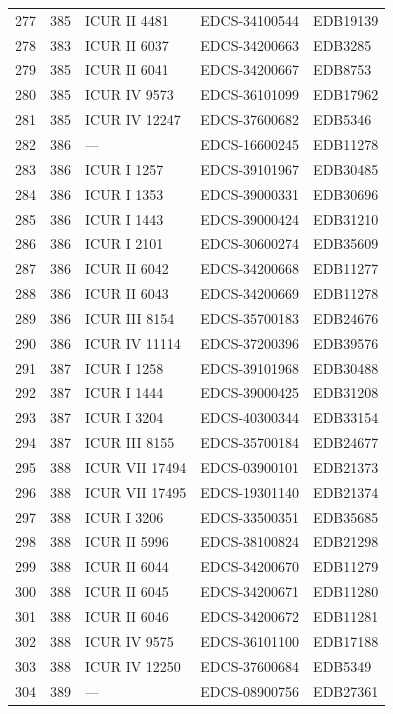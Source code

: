 \begin{longtable}{@{}r r l l l@{}}
277 & 385 & ICUR II 4481 & EDCS-34100544 & EDB19139 \\
278 & 383 & ICUR II 6037 & EDCS-34200663 & EDB3285 \\
279 & 385 & ICUR II 6041 & EDCS-34200667 & EDB8753 \\
280 & 385 & ICUR IV 9573 & EDCS-36101099 & EDB17962 \\
281 & 385 & ICUR IV 12247 & EDCS-37600682 & EDB5346 \\
282 & 386 & — & EDCS-16600245 & EDB11278 \\
283 & 386 & ICUR I 1257 & EDCS-39101967 & EDB30485 \\
284 & 386 & ICUR I 1353 & EDCS-39000331 & EDB30696 \\
285 & 386 & ICUR I 1443 & EDCS-39000424 & EDB31210 \\
286 & 386 & ICUR I 2101 & EDCS-30600274 & EDB35609 \\
287 & 386 & ICUR II 6042 & EDCS-34200668 & EDB11277 \\
288 & 386 & ICUR II 6043 & EDCS-34200669 & EDB11278 \\
289 & 386 & ICUR III 8154 & EDCS-35700183 & EDB24676 \\
290 & 386 & ICUR IV 11114 & EDCS-37200396 & EDB39576 \\
291 & 387 & ICUR I 1258 & EDCS-39101968 & EDB30488 \\
292 & 387 & ICUR I 1444 & EDCS-39000425 & EDB31208 \\
293 & 387 & ICUR I 3204 & EDCS-40300344 & EDB33154 \\
294 & 387 & ICUR III 8155 & EDCS-35700184 & EDB24677 \\
295 & 388 & ICUR VII 17494 & EDCS-03900101 & EDB21373 \\
296 & 388 & ICUR VII 17495 & EDCS-19301140 & EDB21374 \\
297 & 388 & ICUR I 3206 & EDCS-33500351 & EDB35685 \\
298 & 388 & ICUR II 5996 & EDCS-38100824 & EDB21298 \\
299 & 388 & ICUR II 6044 & EDCS-34200670 & EDB11279 \\
300 & 388 & ICUR II 6045 & EDCS-34200671 & EDB11280 \\
301 & 388 & ICUR II 6046 & EDCS-34200672 & EDB11281 \\
302 & 388 & ICUR IV 9575 & EDCS-36101100 & EDB17188 \\
303 & 388 & ICUR IV 12250 & EDCS-37600684 & EDB5349 \\
304 & 389 & — & EDCS-08900756 & EDB27361 \\

\end{longtable}

